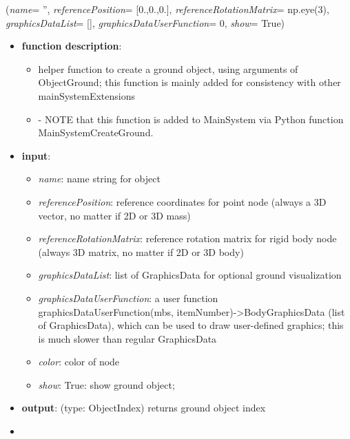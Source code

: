 \begin{flushleft}
\label{sec:mainsystemextensions:CreateGround}
({\it name}= '', {\it referencePosition}= [0.,0.,0.], {\it referenceRotationMatrix}= np.eye(3), {\it graphicsDataList}= [], {\it graphicsDataUserFunction}= 0, {\it show}= True)
\end{flushleft}
\setlength{\itemindent}{0.7cm}
\begin{itemize}[leftmargin=0.7cm]
\item[--]
{\bf function description}: \vspace{-6pt}
\begin{itemize}[leftmargin=1.2cm]
\setlength{\itemindent}{-0.7cm}
\item[]helper function to create a ground object, using arguments of ObjectGround; this function is mainly added for consistency with other mainSystemExtensions
\item[]- NOTE that this function is added to MainSystem via Python function MainSystemCreateGround.
\end{itemize}
\item[--]
{\bf input}: \vspace{-6pt}
\begin{itemize}[leftmargin=1.2cm]
\setlength{\itemindent}{-0.7cm}
\item[]{\it name}: name string for object
\item[]{\it referencePosition}: reference coordinates for point node (always a 3D vector, no matter if 2D or 3D mass)
\item[]{\it referenceRotationMatrix}: reference rotation matrix for rigid body node (always 3D matrix, no matter if 2D or 3D body)
\item[]{\it graphicsDataList}: list of GraphicsData for optional ground visualization
\item[]{\it graphicsDataUserFunction}: a user function graphicsDataUserFunction(mbs, itemNumber)->BodyGraphicsData (list of GraphicsData), which can be used to draw user-defined graphics; this is much slower than regular GraphicsData
\item[]{\it color}: color of node
\item[]{\it show}: True: show ground object;
\end{itemize}
\item[--]
{\bf output}: (type: ObjectIndex) returns ground object index
\item[--]

\end{itemize}
